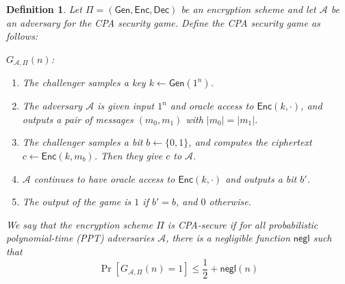 \documentclass[11pt]{article}
\newcommand{\Gen}{\mathsf{Gen}}
\newcommand{\Enc}{\mathsf{Enc}}
\newcommand{\Dec}{\mathsf{Dec}}
\newcommand{\A}{\mathcal{A}}
\newcommand{\negl}{\mathsf{negl}}
\newtheorem{definition}[theorem]{Definition}
\numberwithin{equation}{section}
\begin{document}
\begin{definition}\label{def:CPA-security-predicting-variant}
Let $\Pi = (\Gen, \Enc, \Dec)$ be an encryption scheme and let $\A$ be an adversary for the CPA security game. Define the CPA security game as follows:\newline

\noindent\underline{$G_{\A, \Pi}(n)$}:
\begin{enumerate}
    \item The challenger samples a key $k \leftarrow \Gen(1^n)$.
    \item The adversary $\A$ is given input $1^n$ and oracle access to $\Enc(k, \cdot)$, and outputs a pair of messages $(m_0, m_1)$ with $|m_0| = |m_1|$.
    \item The challenger samples a bit $b \leftarrow \{0,1\}$, and computes the ciphertext $c \leftarrow \Enc(k, m_b)$. Then they give $c$ to $\A$.
    \item $\A$ continues to have oracle access to $\Enc(k, \cdot)$ and outputs a bit $b'$.
    \item The output of the game is $1$ if $b' = b$, and $0$ otherwise.
\end{enumerate}

We say that the encryption scheme $\Pi$ is CPA-secure if for all probabilistic polynomial-time (PPT) adversaries $\A$, there is a negligible function $\negl$ such that 
\[\Pr\left[G_{\A, \Pi}(n) = 1\right] \leq \frac{1}{2} + \negl(n)\]    
\end{definition}
\end{document}
